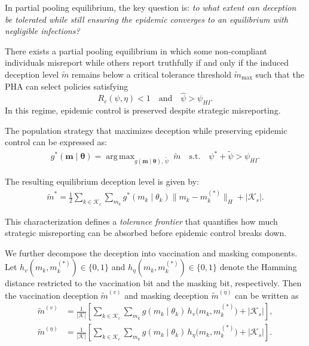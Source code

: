 \documentclass[sigconf,review]{acmart}
\DeclareMathOperator*{\argmax}{arg\,max}
\newcommand{\abs}[1]{\left| #1 \right|}
\begin{document}
In partial pooling equilibrium, the key question is: \emph{to what extent can deception be tolerated while still ensuring the epidemic converges to an equilibrium with negligible infections?}

\begin{theorem}
\label{thm:partial}
There exists a partial pooling equilibrium in which some non-compliant individuals misreport while others report truthfully if and only if the induced deception level $\tilde{m}$ remains below a critical tolerance threshold $\tilde{m}_{\max}$ such that the PHA can select policies satisfying
\[
R_c(\psi,\eta) < 1 \quad \text{and} \quad \widehat{\psi} > \psi_{HI}.
\]
In this regime, epidemic control is preserved despite strategic misreporting.
\end{theorem}

The population strategy that maximizes deception while preserving epidemic control can be expressed as:
\begin{equation}
\begin{aligned}
g^{\ast}(\boldsymbol{m}\mid \boldsymbol{\theta})
= \argmax_{g(\boldsymbol{m}\mid\boldsymbol{\theta}),\,\tilde{\psi}} \ \tilde{m}
\quad
\text{s.t.}\quad
\psi^{\ast} + \tilde{\psi} > \psi_{HI}.
\end{aligned}
\end{equation}

The resulting equilibrium deception level is given by:
\begin{equation}
\begin{aligned}
\tilde{m}^{\ast}
=
\frac{1}{2}\sum_{k\in \mathcal{K}_c}\sum_{m_k} g^{\ast}(m_k\mid \theta_k)\lVert m_k-m_k^{(\ast)} \rVert_H
+ |\mathcal{K}_s|.
\end{aligned}
\end{equation}

This characterization defines a \emph{tolerance frontier} that quantifies how much strategic misreporting can be absorbed before epidemic control breaks down.

We further decompose the deception into vaccination and masking components.
Let $h_v(m_k,m_k^{(*)}) \in \{0,1\}$ and $h_\eta(m_k,m_k^{(*)}) \in \{0,1\}$
denote the Hamming distance restricted to the vaccination bit and the
masking bit, respectively. Then the vaccination deception $\tilde{m}^{(v)}$
and masking deception $\tilde{m}^{(\eta)}$ can be written as
\begin{align}
\tilde{m}^{(v)}
  &= \frac{1}{|\mathcal K|}
\left[\sum_{k \in \mathcal{K}_c} \sum_{m_k} g(m_k \mid \theta_k)\,
     h_v\!\bigl(m_k, m_k^{(*)}\bigr)
     + \abs{\mathcal{K}_s}\right], \label{eq:vax-deception} \\[4pt]
\tilde{m}^{(\eta)}
  &= \frac{1}{|\mathcal K|}
\left[\sum_{k \in \mathcal{K}_c} \sum_{m_k} g(m_k \mid \theta_k)\,
     h_\eta\!\bigl(m_k, m_k^{(*)}\bigr)
     + \abs{\mathcal{K}_s}\right]. \label{eq:mask-deception}
\end{align}
\end{document}
